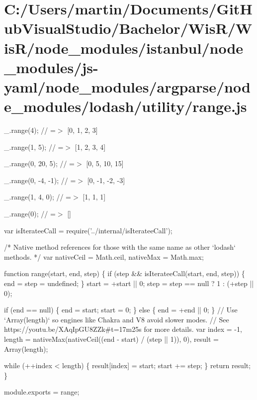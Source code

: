\hypertarget{_c_1_2_users_2martin_2_documents_2_git_hub_visual_studio_2_bachelor_2_wis_r_2_wis_r_2node_module2ee5492b139b46c7128e2f7da891638a}{}\section{C\+:/\+Users/martin/\+Documents/\+Git\+Hub\+Visual\+Studio/\+Bachelor/\+Wis\+R/\+Wis\+R/node\+\_\+modules/istanbul/node\+\_\+modules/js-\/yaml/node\+\_\+modules/argparse/node\+\_\+modules/lodash/utility/range.\+js}
\+\_\+.\+range(4); // =$>$ \mbox{[}0, 1, 2, 3\mbox{]}

\+\_\+.\+range(1, 5); // =$>$ \mbox{[}1, 2, 3, 4\mbox{]}

\+\_\+.\+range(0, 20, 5); // =$>$ \mbox{[}0, 5, 10, 15\mbox{]}

\+\_\+.\+range(0, -\/4, -\/1); // =$>$ \mbox{[}0, -\/1, -\/2, -\/3\mbox{]}

\+\_\+.\+range(1, 4, 0); // =$>$ \mbox{[}1, 1, 1\mbox{]}

\+\_\+.\+range(0); // =$>$ \mbox{[}\mbox{]}


\begin{DoxyCodeInclude}
var isIterateeCall = require(\textcolor{stringliteral}{'../internal/isIterateeCall'});

\textcolor{comment}{/* Native method references for those with the same name as other `lodash` methods. */}
var nativeCeil = Math.ceil,
    nativeMax = Math.max;

\textcolor{keyword}{function} range(start, end, step) \{
  \textcolor{keywordflow}{if} (step && isIterateeCall(start, end, step)) \{
    end = step = undefined;
  \}
  start = +start || 0;
  step = step == null ? 1 : (+step || 0);

  \textcolor{keywordflow}{if} (end == null) \{
    end = start;
    start = 0;
  \} \textcolor{keywordflow}{else} \{
    end = +end || 0;
  \}
  \textcolor{comment}{// Use `Array(length)` so engines like Chakra and V8 avoid slower modes.}
  \textcolor{comment}{// See https://youtu.be/XAqIpGU8ZZk#t=17m25s for more details.}
  var index = -1,
      length = nativeMax(nativeCeil((end - start) / (step || 1)), 0),
      result = Array(length);

  \textcolor{keywordflow}{while} (++index < length) \{
    result[index] = start;
    start += step;
  \}
  \textcolor{keywordflow}{return} result;
\}

module.exports = range;
\end{DoxyCodeInclude}
 